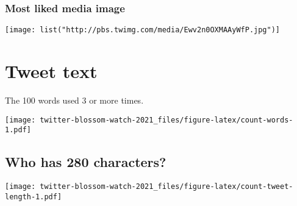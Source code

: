 \documentclass[
]{article}
\begin{document}
\hypertarget{most-liked-media-image}{%
\subsubsection{Most liked media image}\label{most-liked-media-image}}

\texttt{[image: list("http://pbs.twimg.com/media/Ewv2n0OXMAAyWfP.jpg")]}

\hypertarget{tweet-text}{%
\section{Tweet text}\label{tweet-text}}

The 100 words used 3 or more times.

\texttt{[image: twitter-blossom-watch-2021\_files/figure-latex/count-words-1.pdf]}

\hypertarget{who-has-280-characters}{%
\subsection{Who has 280 characters?}\label{who-has-280-characters}}

\texttt{[image: twitter-blossom-watch-2021\_files/figure-latex/count-tweet-length-1.pdf]}
\end{document}
